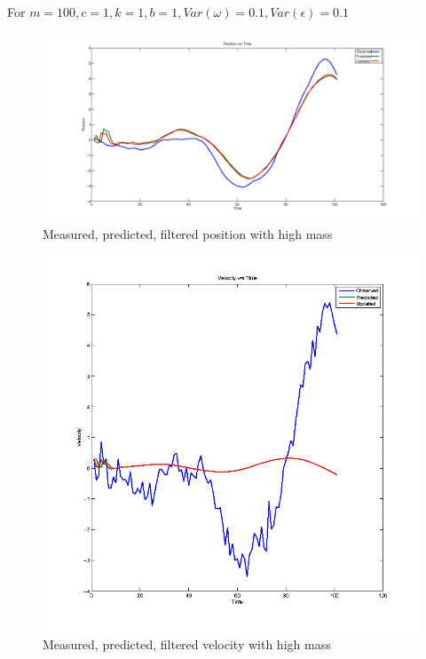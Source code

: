 \documentclass[12pt,english]{article}
\begin{document}
For $m=100,c=1,k=1,b=1, Var(\omega)=0.1, Var(\epsilon)=0.1$


\begin{figure}
    \includegraphics[width=\linewidth]{kalman-position-m100}
    \caption{Measured, predicted, filtered position with high mass}
\end{figure}

\begin{figure}
    \includegraphics[width=\linewidth]{kalman-velocity-m100}
    \caption{Measured, predicted, filtered velocity with high mass}
\end{figure}
\end{document}
